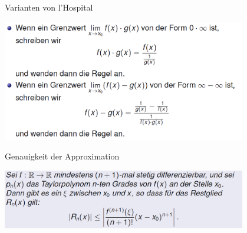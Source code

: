 \begin{definition}{Varianten von l'Hospital}\\
  \begin{centering}
  \includegraphics[width=0.8\textwidth]{images/2024-06-02-21-43-36.png}\\
  \end{centering}
\end{definition}
\begin{definition}{Genauigkeit der Approximation}\\
  \begin{centering}
  \includegraphics[width=0.8\textwidth]{images/2024-06-02-21-45-47.png}\\
  \end{centering}
\end{definition}
